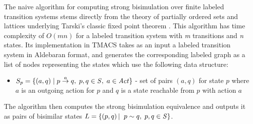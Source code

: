 The naive algorithm for computing strong bisimulation over finite labeled transition systems stems directly from the theory of partially ordered sets and lattices \cite{ReactiveSystems} underlying Tarski's classic fixed point theorem \cite{Tarsky}. This algorithm has time complexity of $O(mn)$ for a labeled transition system with \emph{m} transitions and \emph{n} states. Its implementation in TMACS takes as an input a labeled transition system in Aldebaran format, and generates the corresponding labeled graph as a list of nodes representing the states which use the following data structure:
\begin{itemize}
	\item $S_p=\{(a, q)\hspace{1mm}|\hspace{1mm} p\stackrel{a}{\rightarrow}q, \hspace{1mm} p,q\in \mathit{S}, \hspace{1mm} a\in \mathit{Act}\}$ - set of pairs $(a, q)$ for state $p$ where $a$ is an outgoing action for $p$ and $q$ is a state
	reachable from $p$ with action $a$
\end{itemize}
The algorithm then computes the strong bisimulation equivalence and outputs it as pairs of bisimilar states $L = \left\{\left(p,q\right)|\hspace{1mm}\hspace{1mm} p\sim q, \hspace{1mm}p,q\in \mathit{S}\right\}$.

